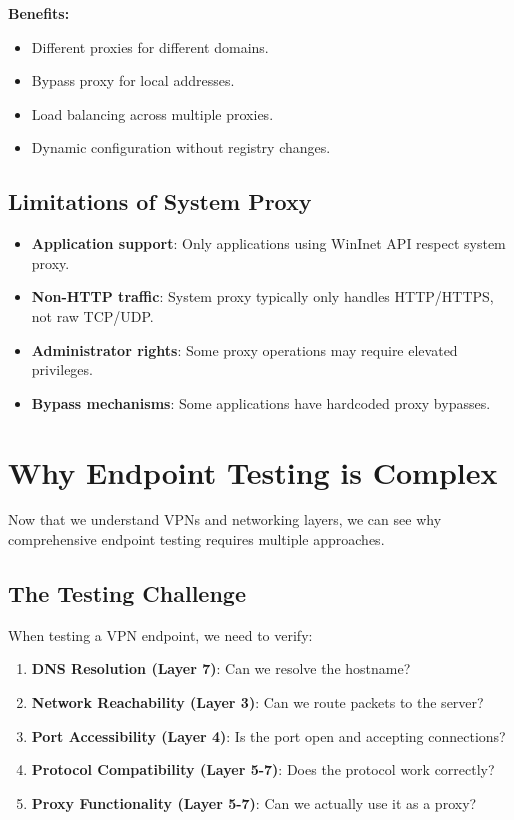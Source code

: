 \textbf{Benefits:}
\begin{itemize}
    \item Different proxies for different domains.
    \item Bypass proxy for local addresses.
    \item Load balancing across multiple proxies.
    \item Dynamic configuration without registry changes.
\end{itemize}

\subsection{Limitations of System Proxy}

\begin{itemize}
    \item \textbf{Application support}: Only applications using WinInet API respect system proxy.
    \item \textbf{Non-HTTP traffic}: System proxy typically only handles HTTP/HTTPS, not raw TCP/UDP.
    \item \textbf{Administrator rights}: Some proxy operations may require elevated privileges.
    \item \textbf{Bypass mechanisms}: Some applications have hardcoded proxy bypasses.
\end{itemize}

\section{Why Endpoint Testing is Complex}

Now that we understand VPNs and networking layers, we can see why comprehensive endpoint testing requires multiple approaches.

\subsection{The Testing Challenge}

When testing a VPN endpoint, we need to verify:

\begin{enumerate}
    \item \textbf{DNS Resolution (Layer 7)}: Can we resolve the hostname?
    \item \textbf{Network Reachability (Layer 3)}: Can we route packets to the server?
    \item \textbf{Port Accessibility (Layer 4)}: Is the port open and accepting connections?
    \item \textbf{Protocol Compatibility (Layer 5-7)}: Does the protocol work correctly?
    \item \textbf{Proxy Functionality (Layer 5-7)}: Can we actually use it as a proxy?
\end{enumerate}

